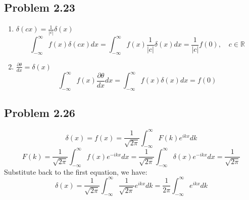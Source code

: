 \documentclass{article}
\begin{document}
\subsection*{Problem 2.23}
\begin{enumerate}[label=(\alph*)]
	\item \(\delta(cx) = \frac{1}{|c|} \delta(x)\)
	      \[\int_{-\infty}^{\infty} f(x) \delta(cx) dx = \int_{-\infty}^{\infty} f(x) \frac{1}{|c|} \delta(x) dx = \frac{1}{|c|} f(0), \quad c \in \mathbb{R}\]
	\item \(\frac{\partial \theta}{dx} = \delta(x)\)
	      \[\int_{-\infty}^{\infty} f(x) \frac{\partial \theta}{dx} dx = \int_{-\infty}^{\infty} f(x) \delta(x) dx = f(0)\]
\end{enumerate}

\subsection*{Problem 2.26}
\[\delta(x) = f(x)  = \frac{1}{\sqrt{2 \pi}} \int_{-\infty}^{\infty} F(k) e^{i k x} dk  \]
\[F(k)  = \frac{1}{\sqrt{2 \pi}} \int_{-\infty}^{\infty} f(x) e^{-i k x} dx = \frac{1}{\sqrt{2 \pi}} \int_{-\infty}^{\infty} \delta (x) e^{-i k x} dx = \frac{1}{\sqrt{2\pi}}\]
Substitute back to the first equation, we have:
\[\delta(x) = \frac{1}{\sqrt{2 \pi}} \int_{-\infty}^{\infty} \frac{1}{\sqrt{2\pi}} e^{i k x} dk = \frac{1}{2 \pi} \int_{-\infty}^{\infty} e^{i k x} dk\]
\end{document}
